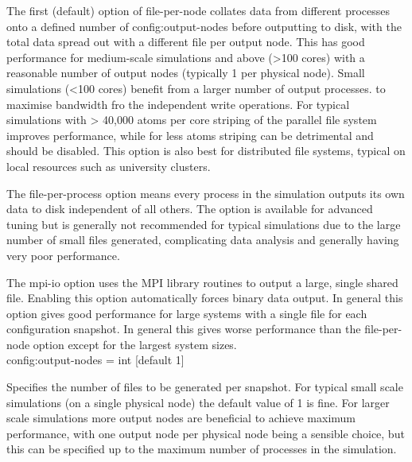 The first (default) option of file-per-node collates data from
different processes onto a defined number of config:output-nodes before
outputting to disk, with the total data spread out with a different file per
output node. This has good performance for medium-scale simulations and above
(>100 cores) with a reasonable number of output nodes (typically 1 per physical
node). Small simulations (<100 cores) benefit from a larger number of output
processes. to maximise bandwidth fro the independent write operations. For
typical simulations with > 40,000 atoms per core striping of the parallel file
system improves performance, while for less atoms striping can be detrimental
and should be disabled. This option is also best for distributed file systems,
typical on local resources such as university clusters.

The file-per-process option means every process in the simulation outputs its
own data to disk independent of all others. The option is available for advanced
tuning but is generally not recommended for typical simulations due to the large
number of small files generated, complicating data analysis and generally having
very poor performance.

The mpi-io option uses the MPI library routines to output a large, single shared
file. Enabling this option automatically forces binary data output. In general
this option gives good performance for large systems with a single file for each
configuration snapshot. In general this gives worse performance than the
file-per-node option except for the largest system sizes.\\

{\zicf config:output-nodes = int [default 1]}
Specifies the number of files to be generated per snapshot. For typical small
scale simulations (on a single physical node) the default value of 1 is fine.
For larger scale simulations more output nodes are beneficial to achieve maximum
performance, with one output node per physical node being a sensible choice, but
this can be specified up to the maximum number of processes in the simulation.\\
